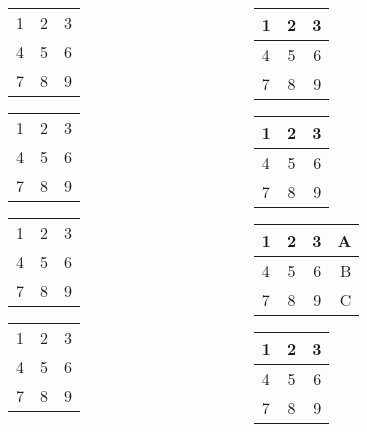 \begin{frame}

    \begin{columns}[onlytextwidth]
        \begin{column}{0.48\textwidth}
            \centering
			\begin{tabular}{l c r}
			1 & 2 & 3 \\
            4 & 5 & 6 \\
            7 & 8 & 9 \\
			\end{tabular}
            \begin{tabular}{l|c|r}
			1 & 2 & 3 \\
            4 & 5 & 6 \\
            7 & 8 & 9 \\
			\end{tabular}
            
            
            \begin{tabular}{|l|c|r|}
			1 & 2 & 3 \\
            4 & 5 & 6 \\
            7 & 8 & 9 \\
			\end{tabular}
            \begin{tabular}{l||c||r}
			1 & 2 & 3 \\
            4 & 5 & 6 \\
            7 & 8 & 9 \\
			\end{tabular}
		\end{column}
                \begin{column}{0.48\textwidth}
            \centering
			\begin{tabular}{l|c|r}
			1 & 2 & 3 \\ \hline
            4 & 5 & 6 \\ \hline
            7 & 8 & 9 \\ \hline
			\end{tabular}
            \begin{tabular}{l|c|r}
			1 & 2 & 3 \\ \hline
            4 & 5 & 6 \\
            7 & 8 & 9 \\
			\end{tabular}
            \begin{tabular}{l|c|r r}
			1 & 2 & 3 & A \\ \hline
            4 & 5 & 6 & B \\ 
            7 & 8 & 9 & C \\
			\end{tabular}
            \begin{tabular}{l|c|r}
			1 & 2 & 3 \\ \hline
            4 & 5 & 6 \\ \cline{2-2}
            7 & 8 & 9 \\
			\end{tabular}
		\end{column}
        
	\end{columns}
\end{frame}
